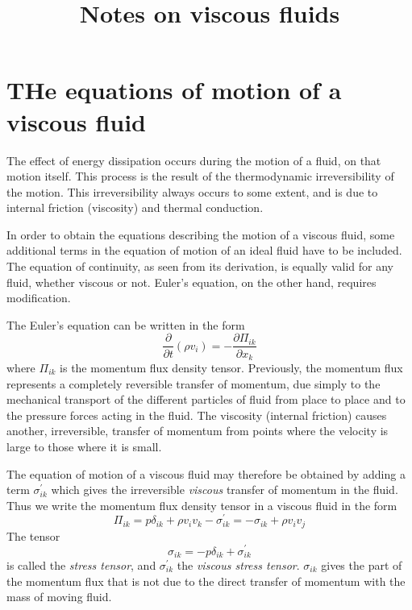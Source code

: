 \documentclass[conference]{IEEEtran}
\theoremstyle{definition}
\theoremstyle{remark}
\begin{document}
    \title{Notes on viscous fluids}

    \author{}

    \maketitle

    \section{THe equations of motion of a viscous fluid}

    The effect of energy dissipation occurs during the motion of a fluid, on that motion itself. This process is the result of the thermodynamic irreversibility of the motion. This irreversibility always occurs to some extent, and is due to internal friction (viscosity) and thermal conduction.

    In order to obtain the equations describing the motion of a viscous fluid, some additional terms in the equation of motion of an ideal fluid have to be included. The equation of continuity, as seen from its derivation, is equally valid for any fluid, whether viscous or not. Euler's equation, on the other hand, requires modification.

    The Euler's equation can be written in the form
    \[
        \dfrac{\partial}{\partial t} (\rho v_i) = -\dfrac{\partial \Pi_{ik}}{\partial x_k}
    \]
    where $\Pi_{ik}$ is the momentum flux density tensor. Previously, the momentum flux represents a completely reversible transfer of momentum, due simply to the mechanical transport of the different particles of fluid from place to place and to the pressure forces acting in the fluid. The viscosity (internal friction) causes another, irreversible, transfer of momentum from points where the velocity is large to those where it is small.

    The equation of motion of a viscous fluid may therefore be obtained by adding a term $\sigma^\prime_{ik}$ which gives the irreversible \emph{viscous} transfer of momentum in the fluid. Thus we write the momentum flux density tensor in a viscous fluid in the form
    \begin{equation}
        \Pi_{ik} = p\delta_{ik} + \rho v_i v_k - \sigma^\prime_{ik} = -\sigma_{ik} + \rho v_i v_j
    \end{equation}
    The tensor
    \begin{equation}
        \sigma_{ik} = -p\delta_{ik} + \sigma^\prime_{ik}
    \end{equation}
    is called the \emph{stress tensor}, and $\sigma^\prime_{ik}$ the \emph{viscous stress tensor}. $\sigma_{ik}$ gives the part of the momentum flux that is not due to the direct transfer of momentum with the mass of moving fluid.
\end{document}
